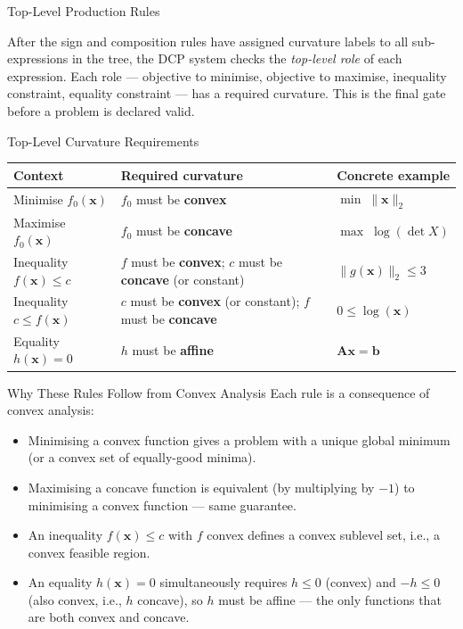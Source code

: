 \documentclass[aspectratio=169,10pt]{beamer}
\begin{document}
\begin{frame}[allowframebreaks]{Top-Level Production Rules}

  After the sign and composition rules have assigned curvature labels to
  all sub-expressions in the tree, the DCP system checks the
  \emph{top-level role} of each expression.  Each role --- objective to
  minimise, objective to maximise, inequality constraint, equality
  constraint --- has a required curvature.  This is the final gate
  before a problem is declared valid.

  \begin{block}{Top-Level Curvature Requirements}
    \begin{tabular}{lll}
      \toprule
      \textbf{Context} & \textbf{Required curvature} & \textbf{Concrete example}\\
      \midrule
      Minimise $f_0(\mathbf{x})$ & $f_0$ must be \textbf{convex}
        & $\min\;\|\mathbf{x}\|_2$\\[2pt]
      Maximise $f_0(\mathbf{x})$ & $f_0$ must be \textbf{concave}
        & $\max\;\log(\det X)$\\[2pt]
      Inequality $f(\mathbf{x}) \leq c$ & $f$ must be \textbf{convex};
        $c$ must be \textbf{concave} (or constant)
        & $\|g(\mathbf{x})\|_2 \leq 3$\\[2pt]
      Inequality $c \leq f(\mathbf{x})$ & $c$ must be \textbf{convex}
        (or constant); $f$ must be \textbf{concave}
        & $0 \leq \log(\mathbf{x})$\\[2pt]
      Equality $h(\mathbf{x}) = 0$ & $h$ must be \textbf{affine}
        & $\mathbf{A}\mathbf{x} = \mathbf{b}$\\
      \bottomrule
    \end{tabular}
  \end{block}

  \begin{alertblock}{Why These Rules Follow from Convex Analysis}
    Each rule is a consequence of convex analysis:
    \begin{itemize}
      \item Minimising a convex function gives a problem with a unique
            global minimum (or a convex set of equally-good minima).
      \item Maximising a concave function is equivalent (by multiplying
            by $-1$) to minimising a convex function --- same guarantee.
      \item An inequality $f(\mathbf{x}) \leq c$ with $f$ convex
            defines a convex sublevel set, i.e., a convex feasible
            region.
      \item An equality $h(\mathbf{x}) = 0$ simultaneously requires $h
            \leq 0$ (convex) and $-h \leq 0$ (also convex, i.e., $h$
            concave), so $h$ must be affine --- the only functions
            that are both convex and concave.
    \end{itemize}
  \end{alertblock}


\end{frame}
\end{document}
